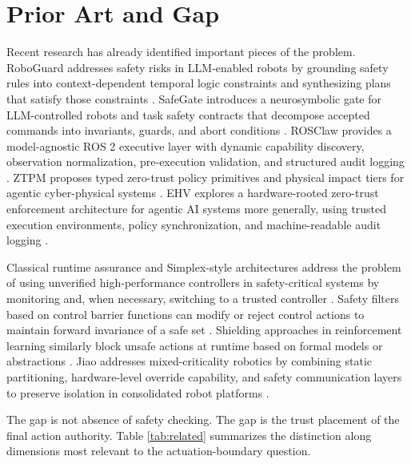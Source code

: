 \documentclass[10pt]{article}
\begin{document}
\section{Prior Art and Gap}

Recent research has already identified important pieces of the problem. RoboGuard addresses safety risks in LLM-enabled robots by grounding safety rules into context-dependent temporal logic constraints and synthesizing plans that satisfy those constraints \cite{roboguard2025}. SafeGate introduces a neurosymbolic gate for LLM-controlled robots and task safety contracts that decompose accepted commands into invariants, guards, and abort conditions \cite{safegate2026}. ROSClaw provides a model-agnostic ROS 2 executive layer with dynamic capability discovery, observation normalization, pre-execution validation, and structured audit logging \cite{rosclaw2026}. ZTPM proposes typed zero-trust policy primitives and physical impact tiers for agentic cyber-physical systems \cite{ztpm2026}. EHV explores a hardware-rooted zero-trust enforcement architecture for agentic AI systems more generally, using trusted execution environments, policy synchronization, and machine-readable audit logging \cite{ehv2026}.

Classical runtime assurance and Simplex-style architectures address the problem of using unverified high-performance controllers in safety-critical systems by monitoring and, when necessary, switching to a trusted controller \cite{simplex2021,nasa2024rta}. Safety filters based on control barrier functions can modify or reject control actions to maintain forward invariance of a safe set \cite{ames2019cbf}. Shielding approaches in reinforcement learning similarly block unsafe actions at runtime based on formal models or abstractions \cite{shields2022}. Jiao addresses mixed-criticality robotics by combining static partitioning, hardware-level override capability, and safety communication layers to preserve isolation in consolidated robot platforms \cite{jiao2026}.

The gap is not absence of safety checking. The gap is the trust placement of the final action authority. Table \ref{tab:related} summarizes the distinction along dimensions most relevant to the actuation-boundary question.
\end{document}
